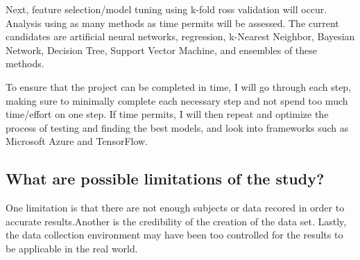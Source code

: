 \documentclass[twoside,11pt]{article}
\begin{document}
  Next, feature selection/model tuning using k-fold ross validation will occur. Analysis using as many methods as time permits will be assessed. The current candidates are artificial neural networks, regression, k-Nearest Neighbor, Bayesian Network, Decision Tree, Support Vector Machine, and ensembles of these methods.
  
  To ensure that the project can be completed in time, I will go through each step, making sure to minimally complete each necessary step and not spend too much time/effort on one step. If time permits, I will then repeat and optimize the process of testing and finding the best models, and look into frameworks such as Microsoft Azure and TensorFlow.

\subsection{What are possible limitations of the study?}

  One limitation is that there are not enough subjects or data recored in order to accurate results.Another is the credibility of the creation of the data set. Lastly, the data collection environment may have been too controlled for the results to be applicable in the real world.


\end{document}
